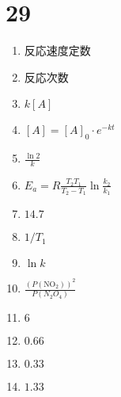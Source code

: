 \documentclass[dvipdfmx]{article}
\begin{document}
    \section*{29}
    \begin{enumerate}
      \item 反応速度定数
      \item 反応次数
      \item $k[A]$
      \item $[A] = [A]_0 \cdot e^{-kt}$
      \item $\frac{\ln 2}{k}$
      \item $E_a = R\frac{T_2 T_1}{T_2 - T_1} \ln \frac{k_2}{k_1}$
      \item $14.7$
      \item $1/T_1$
      \item $\ln k$
      \item $\frac{(P(\mathrm{NO_2}))^2}{P(N_2O_4)}$
      \item $6$
      \item $0.66$
      \item $0.33$
      \item $1.33$
    \end{enumerate}
\end{document}
